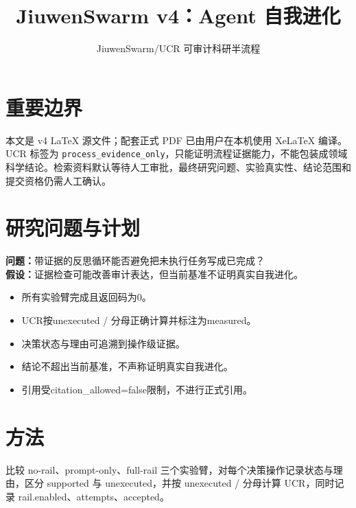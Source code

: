 \documentclass[UTF8]{ctexart}
\title{JiuwenSwarm v4：Agent 自我进化}
\author{JiuwenSwarm/UCR 可审计科研半流程}
\date{}
\begin{document}
\maketitle
\section{重要边界}
本文是 v4 LaTeX 源文件；配套正式 PDF 已由用户在本机使用 XeLaTeX 编译。UCR 标签为 \texttt{process\_evidence\_only}，只能证明流程证据能力，不能包装成领域科学结论。检索资料默认等待人工审批，最终研究问题、实验真实性、结论范围和提交资格仍需人工确认。
\section{研究问题与计划}
\textbf{问题：}带证据的反思循环能否避免把未执行任务写成已完成？\\
\textbf{假设：}证据检查可能改善审计表达，但当前基准不证明真实自我进化。
\begin{itemize}
\item 所有实验臂完成且返回码为0。
\item UCR按unexecuted / 分母正确计算并标注为measured。
\item 决策状态与理由可追溯到操作级证据。
\item 结论不超出当前基准，不声称证明真实自我进化。
\item 引用受citation\_\allowbreak{}allowed=false限制，不进行正式引用。
\end{itemize}
\section{方法}
比较 no-\allowbreak{}rail、prompt-\allowbreak{}only、full-\allowbreak{}rail 三个实验臂，对每个决策操作记录状态与理由，区分 supported 与 unexecuted，并按 unexecuted / 分母计算 UCR，同时记录 rail.enabled、attempts、accepted。
\end{document}
